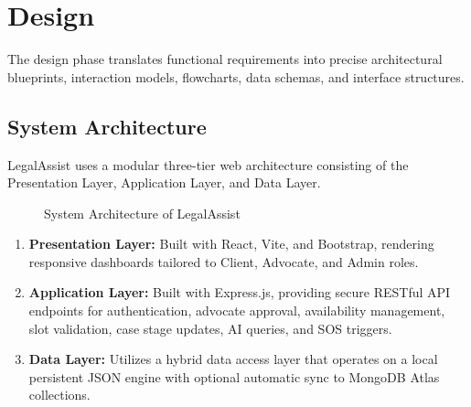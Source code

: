 \chapter{Design}

The design phase translates functional requirements into precise architectural blueprints, interaction models, flowcharts, data schemas, and interface structures.

\section{System Architecture}
LegalAssist uses a modular three-tier web architecture consisting of the Presentation Layer, Application Layer, and Data Layer.

\begin{figure}[h!]
    \centering
    \caption{System Architecture of LegalAssist}
    \label{fig:system_architecture}
\end{figure}

\begin{enumerate}
    \item \textbf{Presentation Layer:} Built with React, Vite, and Bootstrap, rendering responsive dashboards tailored to Client, Advocate, and Admin roles.
    \item \textbf{Application Layer:} Built with Express.js, providing secure RESTful API endpoints for authentication, advocate approval, availability management, slot validation, case stage updates, AI queries, and SOS triggers.
    \item \textbf{Data Layer:} Utilizes a hybrid data access layer that operates on a local persistent JSON engine with optional automatic sync to MongoDB Atlas collections.
\end{enumerate}

